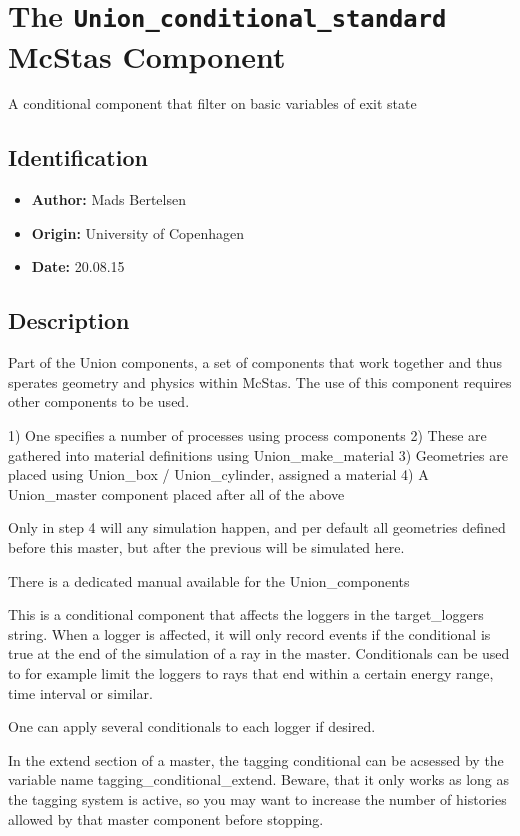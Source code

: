 \section{The \texttt{Union\_conditional\_standard} McStas Component}
A conditional component that filter on basic variables of exit state

\subsection*{Identification}
\begin{itemize}
  \item \textbf{Author:} Mads Bertelsen
  \item \textbf{Origin:} University of Copenhagen
  \item \textbf{Date:} 20.08.15
\end{itemize}

\subsection*{Description}
Part of the Union components, a set of components that work together and thus sperates geometry and physics within McStas. The use of this component requires other components to be used.

1) One specifies a number of processes using process components 2) These are gathered into material definitions using Union\_make\_material 3) Geometries are placed using Union\_box / Union\_cylinder, assigned a material 4) A Union\_master component placed after all of the above

Only in step 4 will any simulation happen, and per default all geometries defined before this master, but after the previous will be simulated here.

There is a dedicated manual available for the Union\_components

This is a conditional component that affects the loggers in the target\_loggers string. When a logger is affected, it will only record events if the conditional is true at the end of the simulation of a ray in the master. Conditionals can be used to for example limit the loggers to rays that end within a certain energy range, time interval or similar.

One can apply several conditionals to each logger if desired.

In the extend section of a master, the tagging conditional can be acsessed by the variable name tagging\_conditional\_extend. Beware, that it only works as long as the tagging system is active, so you may want to increase the number of histories allowed by that master component before stopping.

